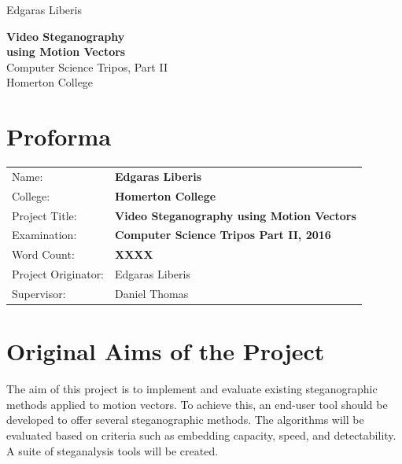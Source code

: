 \documentclass[12pt,british,twoside,notitlepage,usenames,dvipsnames,hypens,final]{report}
\numberwithin{equation}{section}
\numberwithin{figure}{section}
\begin{document}
\pagestyle{empty}

\hfill{\LARGE Edgaras Liberis}

\vspace*{60mm}
\begin{center}
\Huge
{\bf Video Steganography \\ using Motion Vectors} \\
\vspace*{10mm}
{ \sc \LARGE
Computer Science Tripos, Part II \\
Homerton College \\
}
\vspace*{10mm}
\the\year 
\end{center}

\cleardoublepage

\setcounter{page}{1}
\pagestyle{plain}

{\section*{\Huge Proforma}}

{\large
\begin{tabular}{ll}
Name:               & \bf Edgaras Liberis                          \\
College:            & \bf Homerton College                         \\
Project Title:      & \bf Video Steganography using Motion Vectors \\
Examination:        & \bf Computer Science Tripos Part II, 2016    \\
Word Count:         & \bf XXXX\footnotemark[1]                     \\
Project Originator: & Edgaras Liberis                              \\
Supervisor:         & Daniel Thomas                                \\ 
\end{tabular}
}
\vspace{0.5cm}

\section*{Original Aims of the Project}

The aim of this project is to implement and evaluate existing steganographic methods applied to motion vectors. To achieve this, an end-user tool should be developed to offer several steganographic methods. The algorithms will be evaluated based on criteria such as embedding capacity, speed, and detectability. A suite of steganalysis tools will be created.   
\end{document}
